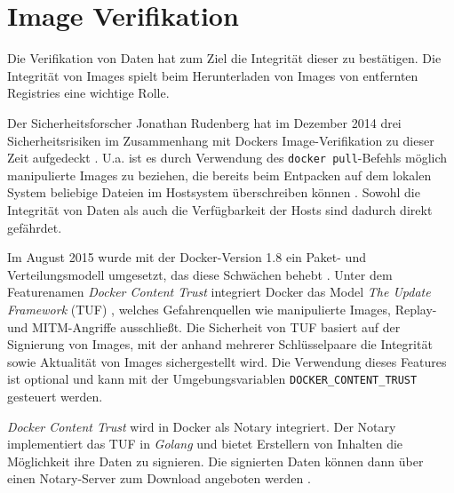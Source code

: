 \documentclass[../main.tex]{subfiles}
\begin{document}
  \section{Image Verifikation}
    Die Verifikation von Daten hat zum Ziel die Integrität dieser zu bestätigen. Die Integrität von Images spielt beim Herunterladen von Images von entfernten Registries eine wichtige Rolle.

    Der Sicherheitsforscher Jonathan Rudenberg hat im Dezember 2014 drei Sicherheitsrisiken im Zusammenhang mit Dockers Image-Verifikation zu dieser Zeit aufgedeckt \cite{https://github.com/docker/docker/issues/9719}\cite{https://titanous.com/posts/docker-insecurity}. U.a. ist es durch Verwendung des \texttt{docker pull}-Befehls möglich manipulierte Images zu beziehen, die bereits beim Entpacken auf dem lokalen System beliebige Dateien im Hostsystem überschreiben können \cite{ https://securityblog.redhat.com/2014/12/18/before-you-initiate-a-docker-pull/ }. Sowohl die Integrität von Daten als auch die Verfügbarkeit der Hosts sind dadurch direkt gefährdet.

    Im August 2015 wurde mit der Docker-Version 1.8 ein Paket- und Verteilungsmodell umgesetzt, das diese Schwächen behebt \cite{ https://blog.docker.com/2015/08/content-trust-docker-1-8/ }. Unter dem Featurenamen \emph{Docker Content Trust} integriert Docker das Model \emph{The Update Framework} (TUF) \cite{ https://theupdateframework.github.io/ }, welches Gefahrenquellen wie manipulierte Images, Replay- und MITM-Angriffe ausschließt. Die Sicherheit von TUF basiert auf der Signierung von Images, mit der anhand mehrerer Schlüsselpaare die Integrität sowie Aktualität von Images sichergestellt wird. Die Verwendung dieses Features ist optional und kann mit der Umgebungsvariablen \texttt{DOCKER_CONTENT_TRUST} gesteuert werden.

    \emph{Docker Content Trust} wird in Docker als Notary integriert. Der Notary implementiert das TUF in \emph{Golang} und bietet Erstellern von Inhalten die Möglichkeit ihre Daten zu signieren. Die signierten Daten können dann über einen Notary-Server zum Download angeboten werden \cite{https://github.com/docker/notary}.


\end{document}
